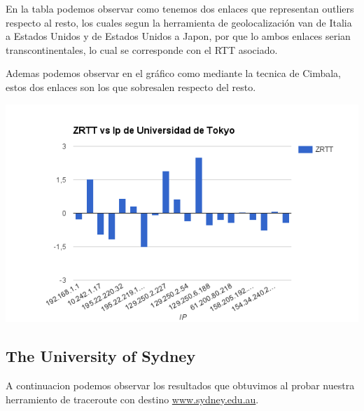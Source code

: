 En la tabla podemos observar como tenemos dos enlaces que representan outliers respecto al resto, los cuales segun la
herramienta de geolocalización van de Italia a Estados Unidos y de Estados Unidos a Japon, por que lo ambos enlaces
serian transcontinentales, lo cual se corresponde con el RTT asociado.

Ademas podemos observar en el gráfico como mediante la tecnica de Cimbala, estos dos enlaces son los que sobresalen
respecto del resto.

\begin{center}
\includegraphics[width=\textwidth]{imgs/tokyo.png}
\end{center}


\subsection{The University of Sydney}
A continuacion podemos observar los resultados que obtuvimos al probar nuestra herramiento de traceroute
con destino \url{www.sydney.edu.au}.

